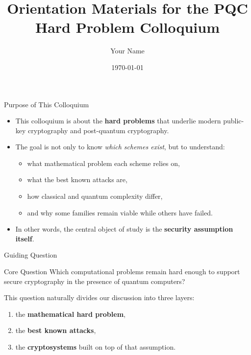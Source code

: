 \documentclass[aspectratio=169]{beamer}
\title[PQC Hard Problem Colloquium]{Orientation Materials for the PQC Hard Problem Colloquium}
\author{Your Name}
\institute{Your Institution / Research Group}
\date{\today}
\begin{document}
	
	\begin{frame}
		\titlepage
	\end{frame}
	
	\begin{frame}{Purpose of This Colloquium}
		\begin{itemize}
			\item This colloquium is about the \textbf{hard problems} that underlie modern public-key cryptography and post-quantum cryptography.
			\item The goal is not only to know \emph{which schemes exist}, but to understand:
			\begin{itemize}
				\item what mathematical problem each scheme relies on,
				\item what the best known attacks are,
				\item how classical and quantum complexity differ,
				\item and why some families remain viable while others have failed.
			\end{itemize}
			\item In other words, the central object of study is the \textbf{security assumption itself}.
		\end{itemize}
	\end{frame}
	
	\begin{frame}{Guiding Question}
		\begin{block}{Core Question}
			Which computational problems remain hard enough to support secure cryptography in the presence of quantum computers?
		\end{block}
		
		\vspace{0.5em}
		This question naturally divides our discussion into three layers:
		\begin{enumerate}
			\item the \textbf{mathematical hard problem},
			\item the \textbf{best known attacks},
			\item the \textbf{cryptosystems} built on top of that assumption.
		\end{enumerate}
	\end{frame}
	
\end{document}

